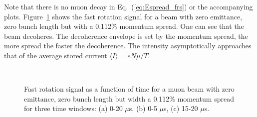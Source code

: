 Note that there is no muon decay in Eq.~(\ref{eq:Espread_frs}) or the accompanying plots.
Figure~\ref{fig:Espread_frs} shows the fast rotation signal for a beam with zero emittance, zero bunch length but with a 0.112\% momentum spread. 
One can see that the beam decoheres. The decoherence envelope is set by the momentum spread, the more spread the faster the decoherence.
The intensity asymptotically approaches that of the average stored current $\langle I\rangle = eN\mu/T$.

\begin{figure}[bt]
\centering
{}\\
\caption{Fast rotation signal as a function of time for a muon beam with zero emittance, zero bunch length but width a 0.112\% momentum spread for three time windows: (a) 0-20 $\mu$s, (b) 0-5 $\mu$s, (c) 15-20 $\mu$s.}
\label{fig:Espread_frs}
\end{figure}

